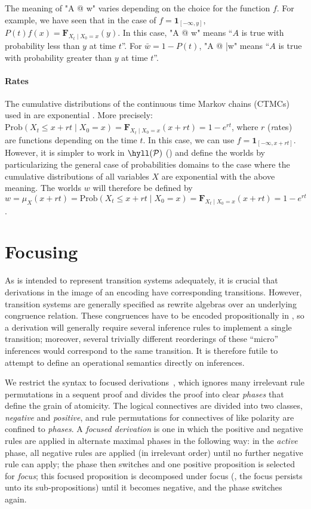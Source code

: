 \documentclass{article}
\begin{document}
The meaning of "A @ w" varies depending on the choice for the function $f$. For
example, we have seen that in the case of $f = {\mathbf 1}_{[-\infty,y]}$, ~$P(t)
f (x) = {\mathbf F}_{X_t \mid X_0=x}(y)$. In this case, "A @ w" means ``$A$ is
true with probability less than $y$ at time $t$''. For $\bar{w}= 1 - P(t)$, "A @
\bar{w}" means ``$A$ is true with probability greater than $y$ at time $t$''.

\paragraph{Rates}
The cumulative distributions of the continuous time Markov chains (CTMCs) 
used in \spi are exponential \cite{phillips06tcsb}.
More precisely:
$\text{Prob}(X_t \le x + rt \mid X_0=x) = {\mathbf F}_{X_t \mid X_0=x}(x + rt) = 1 - e^{rt}$,
where $r$ ({\emph rates}) are functions depending on the time $t$.
In this case, we can use $f = {\mathbf 1}_{[-\infty, x+rt]}$.
However, it is simpler to 
work in $\hyll(\mathcal P)$ () 
and define the worlds by particularizing the general case of probabilities domains 
to the case where the cumulative distributions of all variables $X$ are exponential 
with the above meaning.
The worlds $w$ will therefore be defined by
$w = \mu_X(x + rt) = \text{Prob}(X_t \le x + rt \mid X_0=x) 
= {\mathbf F}_{X_t \mid X_0=x}(x + rt) = 1 - e^{rt}$.

\section{Focusing}
\label{sec:focusing}

As \hyll is intended to represent transition systems adequately, it is crucial
that \hyll derivations in the image of an encoding have corresponding
transitions. However, transition systems are generally specified as rewrite
algebras over an underlying congruence relation. These congruences have to be
encoded propositionally in \hyll, so a \hyll derivation will generally require
several inference rules to implement a single transition; moreover, several
trivially different reorderings of these ``micro'' inferences would correspond
to the same transition. It is therefore futile to attempt to define an
operational semantics directly on \hyll inferences.

We restrict the syntax to focused derivations~\cite{andreoli92jlc}, which
ignores many irrelevant rule permutations in a sequent proof and divides the
proof into clear \emph{phases} that define the grain of atomicity. The logical
connectives are divided into two classes, \emph{negative} and \emph{positive},
and rule permutations for connectives of like polarity are confined to
\emph{phases}. A \emph{focused derivation} is one in which the positive and
negative rules are applied in alternate maximal phases in the following way: in
the \emph{active} phase, all negative rules are applied (in irrelevant order)
until no further negative rule can apply; the phase then switches and one
positive proposition is selected for \emph{focus}; this focused proposition is
decomposed under focus (\ie, the focus persists unto its sub-propositions) until
it becomes negative, and the phase switches again.
\end{document}
